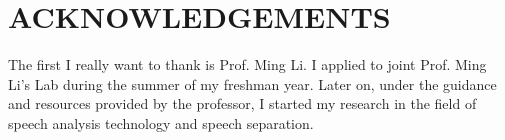 

\section{ACKNOWLEDGEMENTS}\label{sec:acknowledgements}
The first I really want to thank is Prof. Ming Li. I applied to joint Prof. Ming Li's Lab during the summer of my freshman year.
Later on, under the guidance and resources provided by the professor, I started my research in the field of speech analysis technology and speech separation.
